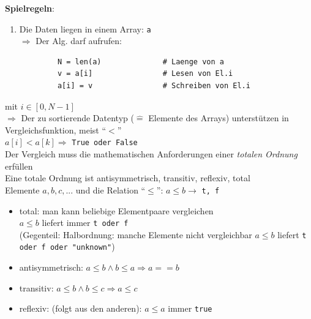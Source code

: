 \documentclass[11pt, fleqn]{scrreprt}
\begin{document}
        \textbf{Spielregeln}:
        \begin{enumerate}
            \item Die Daten liegen in einem Array: \verb|a| \\
            $\Rightarrow$ Der Alg. darf aufrufen: \\
        \end{enumerate}
        \vspace*{-5mm}
        \begin{verbatim}
            N = len(a)              # Laenge von a
            v = a[i]                # Lesen von El.i
            a[i] = v                # Schreiben von El.i
        \end{verbatim}

        mit $i \in [0, N-1]$ \\
        $\Rightarrow$ Der zu sortierende Datentyp ($\widehat{=}$ Elemente des Arrays) unterstützen in Vergleichsfunktion, meist ``$<$'' \\
        $a[i] < a[k] \Rightarrow$ \verb|True oder False| \\

        Der Vergleich muss die mathematischen Anforderungen einer \emph{totalen Ordnung} erfüllen \\


        Eine totale Ordnung ist antisymmetrisch, transitiv, reflexiv, total \\
        Elemente $a,b,c,...$ und die Relation ``$\leq$'': $a \leq b \rightarrow$ \verb|t, f| \\
        \begin{itemize}
                \item total: man kann beliebige Elementpaare vergleichen \\
                $a \leq b$ liefert immer \verb|t oder f| \\
                (Gegenteil: Halbordnung: manche Elemente nicht vergleichbar
                $a\leq b$ liefert \verb|t oder f oder "unknown"|)

                \item antisymmetrisch: $a \leq b \land b \leq a \Rightarrow a == b$
                \item transitiv: $ a \leq b \land b \leq c \Rightarrow a \leq c$
                \item reflexiv: (folgt aus den anderen): $a \leq a$ immer \verb|true|
        \end{itemize}
\end{document}
